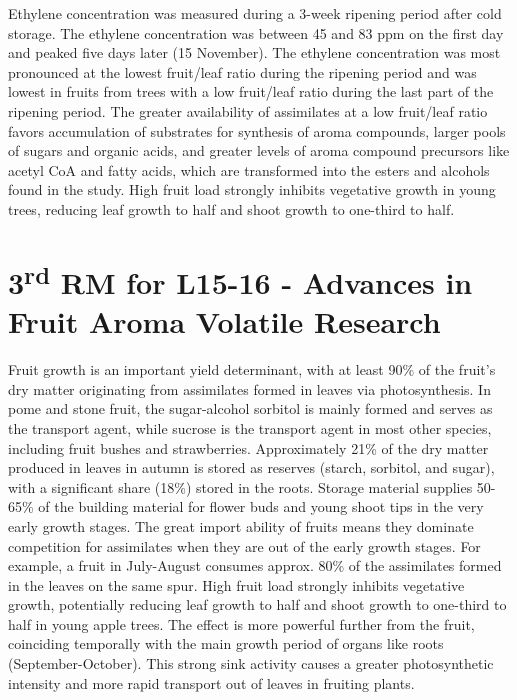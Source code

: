 \vspace{0.5em}
Ethylene concentration was measured during a 3-week ripening period after cold storage. The ethylene concentration was between 45 and 83 ppm on the first day and peaked five days later (15 November). The ethylene concentration was most pronounced at the lowest fruit/leaf ratio during the ripening period and was lowest in fruits from trees with a low fruit/leaf ratio during the last part of the ripening period. The greater availability of assimilates at a low fruit/leaf ratio favors accumulation of substrates for synthesis of aroma compounds, larger pools of sugars and organic acids, and greater levels of aroma compound precursors like acetyl CoA and fatty acids, which are transformed into the esters and alcohols found in the study. High fruit load strongly inhibits vegetative growth in young trees, reducing leaf growth to half and shoot growth to one-third to half.


\section{\texorpdfstring{3\textsuperscript{rd} RM for L15-16 - Advances in Fruit Aroma Volatile Research}{3rd RM for L15-16 - Advances in Fruit Aroma Volatile Research}}

Fruit growth is an important yield determinant, with at least 90\% of the fruit's dry matter originating from assimilates formed in leaves via photosynthesis. In pome and stone fruit, the sugar-alcohol sorbitol is mainly formed and serves as the transport agent, while sucrose is the transport agent in most other species, including fruit bushes and strawberries. Approximately 21\% of the dry matter produced in leaves in autumn is stored as reserves (starch, sorbitol, and sugar), with a significant share (18\%) stored in the roots. Storage material supplies 50-65\% of the building material for flower buds and young shoot tips in the very early growth stages. The great import ability of fruits means they dominate competition for assimilates when they are out of the early growth stages. For example, a fruit in July-August consumes approx. 80\% of the assimilates formed in the leaves on the same spur. High fruit load strongly inhibits vegetative growth, potentially reducing leaf growth to half and shoot growth to one-third to half in young apple trees. The effect is more powerful further from the fruit, coinciding temporally with the main growth period of organs like roots (September-October). This strong sink activity causes a greater photosynthetic intensity and more rapid transport out of leaves in fruiting plants.

